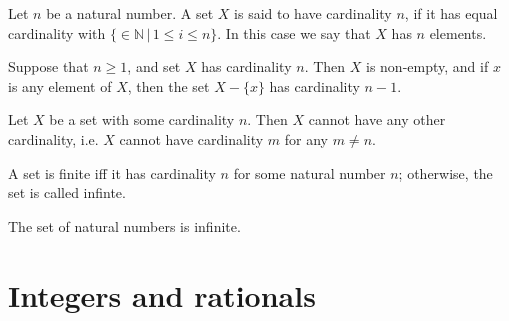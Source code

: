 \documentclass{article}
\begin{document}
\begin{definition}[Cardinality \(n\)]
	Let \(n\) be a natural number. A set \(X\) is said to have cardinality \(n\), if it has equal cardinality with \(\{\in\mathbb{N}\,|\,1\leq i\leq n\}\). In this case we say that \(X\) has \(n\) elements.
\end{definition}
\begin{lemma}
	Suppose that \(n\geq 1\), and set \(X\) has cardinality \(n\). Then \(X\) is non-empty, and if \(x\) is any element of \(X\), then the set \(X-\{x\}\) has cardinality \(n-1\).
\end{lemma}
\begin{proposition}
	Let \(X\) be a set with some cardinality \(n\). Then \(X\) cannot have any other cardinality, i.e. \(X\) cannot have cardinality \(m\) for any \(m\neq n\).
\end{proposition}
\begin{definition}
	A set is finite iff it has cardinality \(n\) for some natural number \(n\); otherwise, the set is called infinte.
\end{definition}
\begin{theorem}
	The set of natural numbers is infinite.
\end{theorem}
\section{Integers and rationals}
\end{document}

